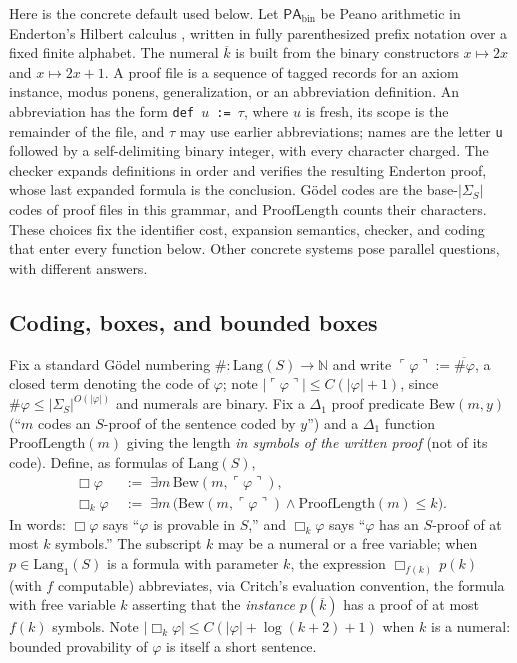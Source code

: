 \documentclass[11pt]{amsart}
\theoremstyle{plain}
\theoremstyle{definition}
\newcommand{\PAbin}{\mathsf{PA}_{\mathrm{bin}}}
\newcommand{\Lang}{\mathrm{Lang}}
\newcommand{\gn}[1]{\ulcorner #1 \urcorner}
\newcommand{\num}[1]{\overline{#1}}
\begin{document}
Here is the concrete default used below. Let $\PAbin$ be Peano arithmetic in Enderton's Hilbert calculus \cite{enderton2001}, written in fully parenthesized prefix notation over a fixed finite alphabet. The numeral $\num{k}$ is built from the binary constructors $x\mapsto 2x$ and $x\mapsto 2x+1$. A proof file is a sequence of tagged records for an axiom instance, modus ponens, generalization, or an abbreviation definition. An abbreviation has the form \texttt{def $u$ := $\tau$}, where $u$ is fresh, its scope is the remainder of the file, and $\tau$ may use earlier abbreviations; names are the letter \texttt{u} followed by a self-delimiting binary integer, with every character charged. The checker expands definitions in order and verifies the resulting Enderton proof, whose last expanded formula is the conclusion. G\"odel codes are the base-$|\Sigma_S|$ codes of proof files in this grammar, and $\mathrm{ProofLength}$ counts their characters. These choices fix the identifier cost, expansion semantics, checker, and coding that enter every function below. Other concrete systems pose parallel questions, with different answers.

\subsection{Coding, boxes, and bounded boxes}
\label{sec:coding}

Fix a standard G\"odel numbering $\#\colon \Lang(S) \to \mathbb{N}$ and write $\gn{\varphi} := \num{\#\varphi}$, a closed term denoting the code of $\varphi$; note $|\gn{\varphi}| \le C(|\varphi|+1)$, since $\#\varphi \le |\Sigma_S|^{O(|\varphi|)}$ and numerals are binary. Fix a $\Delta_1$ proof predicate $\mathrm{Bew}(m,y)$ (``$m$ codes an $S$-proof of the sentence coded by $y$'') and a $\Delta_1$ function $\mathrm{ProofLength}(m)$ giving the length \emph{in symbols of the written proof} (not of its code). Define, as formulas of $\Lang(S)$,
\[
\begin{aligned}
\Box \varphi
  &\;:=\; \exists m\, \mathrm{Bew}(m, \gn{\varphi}),\\
\Box_k \varphi
  &\;:=\; \exists m\, \bigl(\mathrm{Bew}(m, \gn{\varphi})
       \wedge \mathrm{ProofLength}(m) \le k\bigr).
\end{aligned}
\]
In words: $\Box\varphi$ says ``$\varphi$ is provable in $S$,'' and $\Box_k \varphi$ says ``$\varphi$ has an $S$-proof of at most $k$ symbols.'' The subscript $k$ may be a numeral or a free variable; when $p \in \Lang_1(S)$ is a formula with parameter $k$, the expression $\Box_{f(k)}\, p(k)$ (with $f$ computable) abbreviates, via Critch's evaluation convention, the formula with free variable $k$ asserting that the \emph{instance} $p(\num{k})$ has a proof of at most $f(k)$ symbols. Note $|\Box_k\varphi| \le C(|\varphi| + \log(k+2) + 1)$ when $k$ is a numeral: bounded provability of $\varphi$ is itself a short sentence.
\end{document}

